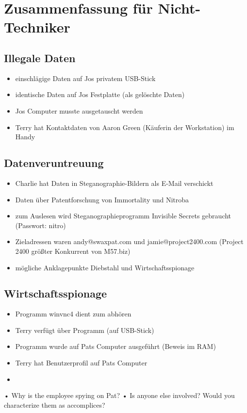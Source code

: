 \chapter{Zusammenfassung für Nicht-Techniker}
\label{sec:nicht_tec}

\section{Illegale Daten}
\label{sec:illegale_daten}
\begin{itemize}
	\item einschlägige Daten auf Jos privatem USB-Stick
	\item identische Daten auf Jos Festplatte (als gelöschte Daten)
	\item Jos Computer musste ausgetauscht werden
	\item Terry hat Kontaktdaten von Aaron Green (Käuferin der Workstation) im Handy
\end{itemize}

\section{Datenveruntreuung}
\label{sec:veruntreuung}
\begin{itemize}
	\item Charlie hat Daten in Steganographie-Bildern als E-Mail verschickt
	\item Daten über Patentforschung von Immortality und Nitroba
	\item zum Auslesen wird Steganographieprogramm Invisible Secrets gebraucht (Passwort: nitro)
	\item Zieladressen waren andy@swaxpat.com und jamie@project2400.com (Project 2400 größter Konkurrent von M57.biz)
	\item mögliche Anklagepunkte Diebstahl und Wirtschaftsspionage
\end{itemize}

\section{Wirtschaftsspionage}
\label{sec:spionage}
\begin{itemize}
	\item Programm winvnc4 dient zum abhören
	\item Terry verfügt über Programm (auf USB-Stick)
	\item Programm wurde auf Pats Computer ausgeführt (Beweis im RAM)
	\item Terry hat Benutzerprofil auf Pats Computer
	\item 
\end{itemize}
• Why is the employee spying on Pat?
• Is anyone else involved? Would you characterize them as accomplices?
